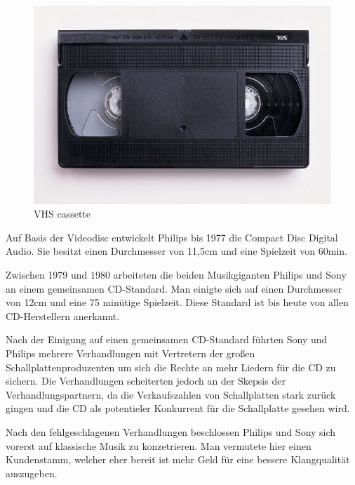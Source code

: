 \begin{figure}[h]
\begin{center}
\begin{minipage}[t]{0.3\textwidth}
        \begin{center}
            \includegraphics[height=0.1\textheight]{Bilder/Optische_Datentraeger_Die_Compact_Disc/Geschichte/vhs.png}
            \caption[VHS cassette \newline \url{https://upload.wikimedia.org/wikipedia/commons/6/67/VHS-cassette.jpg}]{VHS cassette}
            \label{fig:vhs}
        \end{center}
      \end{minipage}
  \end{center}
\end{figure}

Auf Basis der Videodisc entwickelt Philips bis 1977 die Compact Disc Digital
Audio. Sie besitzt einen Durchmesser von 11,5cm und eine Spielzeit von 60min.

Zwischen 1979 und 1980 arbeiteten die beiden Musikgiganten Philips und Sony an
einem gemeinsamen CD-Standard. Man einigte sich auf einen Durchmesser von 12cm
und eine 75 minütige Spielzeit. Diese Standard ist bis heute von allen
CD-Herstellern anerkannt.

Nach der Einigung auf einen gemeinsamen CD-Standard führten Sony und Philips
mehrere Verhandlungen mit Vertretern der großen Schallplattenproduzenten um sich
die Rechte an mehr Liedern für die CD zu sichern. Die Verhandlungen scheiterten
jedoch an der Skepsis der Verhandlungspartnern, da die Verkaufszahlen von
Schallplatten stark zurück gingen und die CD als potentieler Konkurrent für die
Schallplatte gesehen wird.

Nach den fehlgeschlagenen Verhandlungen beschlossen Philips und Sony sich
vorerst auf klassische Musik zu konzetrieren. Man vermutete hier einen
Kundenstamm, welcher eher bereit ist mehr Geld für eine bessere Klangqualität
auszugeben.

